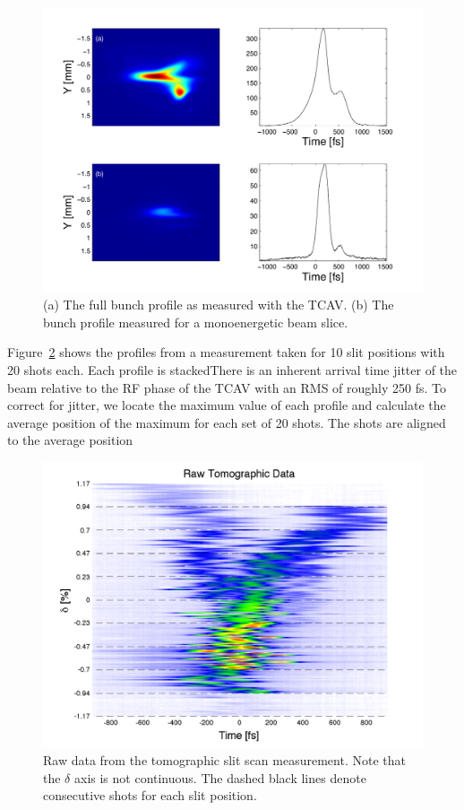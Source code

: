 \documentclass[%
twocolumn,
showpacs,preprintnumbers,
 aps,
prstab,
]{revtex4-1}
\begin{document}
\begin{figure}[hbt]
  \includegraphics[width=\columnwidth]{figures/tcav_slit2.pdf}
  \caption{(a) The full bunch profile as measured with the TCAV. (b) The bunch profile measured for a monoenergetic beam slice.}
  \label{tcav_slit}
\end{figure}

Figure~\ref{raw_data} shows the profiles from a measurement taken for 10 slit positions with 20 shots each. Each profile is stackedThere is an inherent arrival time jitter of the beam relative to the RF phase of the TCAV with an RMS of roughly 250 fs. To correct for jitter, we locate the maximum value of each profile and calculate the average position of the maximum for each set of 20 shots. The shots are aligned to the average position

\begin{figure}[hbt]
  \includegraphics[width=\columnwidth]{figures/raw.pdf}
  \caption{Raw data from the tomographic slit scan measurement. Note that the $\delta$ axis is not continuous. The dashed black lines denote consecutive shots for each slit position.}
  \label{raw_data}
\end{figure}
\end{document}
